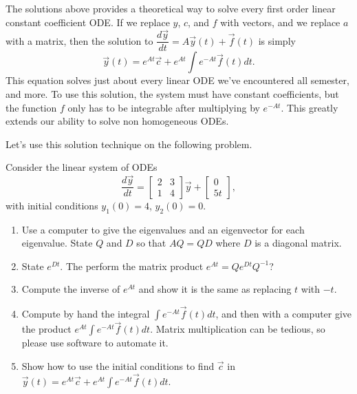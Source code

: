 The solutions above provides a theoretical way to solve every first order linear constant coefficient ODE. If we replace $y$, $c$, and $f$ with vectors, and we replace $a$ with a matrix, then the solution to $\dfrac{d \vec y}{dt} = A\vec y(t)+\vec f(t)$ is simply 
$$\vec y(t) = e^{At}\vec c + e^{At}\int e^{-At}\vec f(t) dt.$$
This equation solves just about every linear ODE we've encountered all semester, and more.  To use this solution, the system must have constant coefficients, but the function $f$ only has to be integrable after multiplying by $e^{-At}$. This greatly extends our ability to solve non homogeneous ODEs. 

Let's use this solution technique on the following problem.

\begin{problem} 
Consider the linear system of ODEs
$$
\frac{d\vec y}{dt}
=
\begin{bmatrix}
 2&3\\1&4
\end{bmatrix}
\vec y +
\begin{bmatrix}
 0\\5t
\end{bmatrix}
,$$
with initial conditions
$y_1(0)=4$, $y_2(0)=0$.
\begin{enumerate}
 \item Use a computer to give the eigenvalues and an eigenvector for each eigenvalue.  State $Q$ and $D$ so that $AQ=QD$ where $D$ is a diagonal matrix. 
 \item 
{}%
State $e^{Dt}$. The perform the matrix product $e^{At} = Qe^{Dt}Q^{-1}$?
 \item Compute the inverse of $e^{At}$ and show it is the same as replacing $t$ with $-t$. 
 \item Compute by hand the integral $\int e^{-At}\vec f(t) dt$, and then with a computer give the product $e^{At}\int e^{-At}\vec f(t) dt$. Matrix multiplication can be tedious, so please use software to automate it.  
 \item Show how to use the initial conditions to find $\vec c$ in $\vec y(t) = e^{At}\vec c + e^{At}\int e^{-At}\vec f(t) dt.$
\end{enumerate}
\end{problem}


